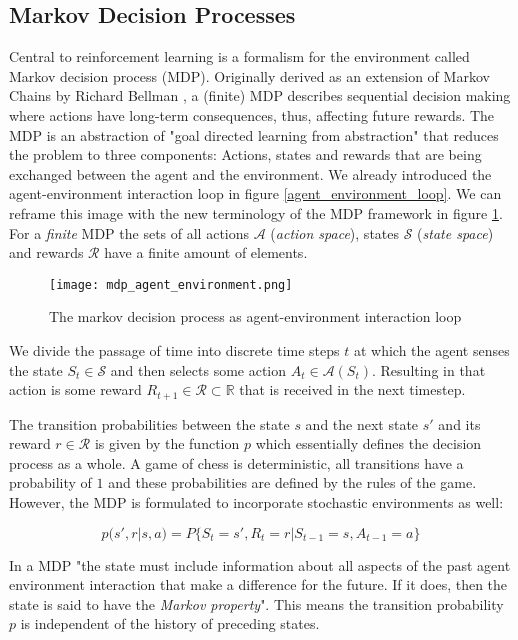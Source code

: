 \subsection{Markov Decision Processes}
Central to reinforcement learning is a formalism for the environment called Markov decision process (MDP). Originally derived as an extension of Markov Chains by Richard Bellman \cite{yang_markov_2019, bellman_markovian_1957}, a (finite) MDP describes sequential decision making where actions have long-term consequences, thus, affecting future rewards. The MDP is an abstraction of "goal directed learning from abstraction" that reduces the problem to three components: Actions, states and rewards that are being exchanged between the agent and the environment. We already introduced the agent-environment interaction loop in figure \ref{agent_environment_loop}. We can reframe this image with the new terminology of the MDP framework in figure \ref{mdp_agent_environment}. For a \textit{finite} MDP the sets of all actions $ \mathcal{A}$ (\textit{action space}), states $\mathcal{S}$ (\textit{state space}) and rewards $ \mathcal{R} $ have a finite amount of elements.

\begin{figure}
    \centering
    \texttt{[image: mdp\_agent\_environment.png]}
    \caption{The markov decision process as agent-environment interaction loop}
    \label{mdp_agent_environment}
\end{figure}

We divide the passage of time into discrete time steps $ t $ at which the agent senses the state $ S_t \in \mathcal{S} $ and then selects some action $ A_t \in \mathcal{A}(S_t) $. Resulting in that action is some reward $ R_{t+1} \in \mathcal{R} \subset \mathbb{R} $ that is received in the next timestep.

The transition probabilities between the state $ s $ and the next state $ s' $ and its reward $r \in \mathcal{R}$ is given by the function $ p $ which essentially defines the decision process as a whole. A game of chess is deterministic, all transitions have a probability of $1$ and these probabilities are defined by the rules of the game. However, the MDP is formulated to incorporate stochastic environments as well:

\begin{equation}
    p(s', r | s, a) = P\{S_t=s', R_t = r | S_{t-1} = s, A_{t-1}=a\}
\end{equation}

In a MDP "the state must include information about all aspects of the past agent environment interaction that make a difference for the future. If it does, then the state is said to have the \textit{Markov property}". \cite[p. 48]{sutton_reinforcement_2018} This means the transition probability $p$ is independent of the history of preceding states.

